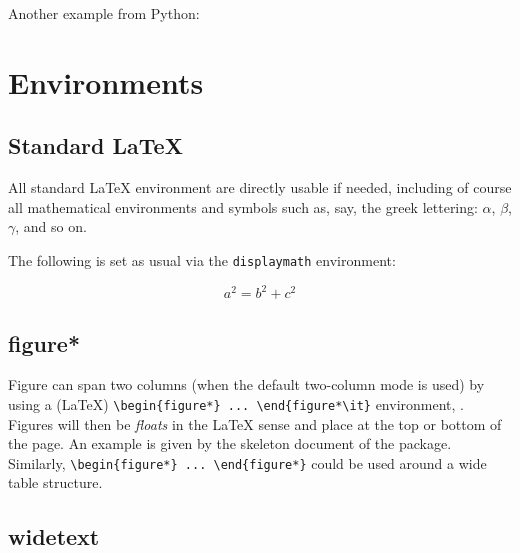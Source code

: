 \documentclass[letterpaper,9pt,twocolumn,twoside,]{pinp}
\begin{document}
Another example from Python:

\begin{Shaded}
\begin{Highlighting}[]
\NormalTok{):}
    
   
\end{Highlighting}
\end{Shaded}

\hypertarget{environments}{%
\section{Environments}\label{environments}}

\hypertarget{standard-latex}{%
\subsection{Standard LaTeX}\label{standard-latex}}

All standard LaTeX environment are directly usable if needed, including
of course all mathematical environments and symbols such as, say, the
greek lettering: \(\alpha\), \(\beta\), \(\gamma\), and so on.

The following is set as usual via the \texttt{displaymath} environment:

\begin{displaymath}
    a^2 = b^2 + c^2
\end{displaymath}

\hypertarget{figure}{%
\subsection{figure*}\label{figure}}

Figure can span two columns (when the default two-column mode is used)
by using a (LaTeX)
\texttt{\textbackslash{}begin\{figure*\}\ ...\ \textbackslash{}end\{figure*\textbackslash{}it\}}
environment, . Figures will then be \emph{floats} in the LaTeX sense and
place at the top or bottom of the page. An example is given by the
skeleton document of the package. Similarly,
\texttt{\textbackslash{}begin\{figure*\}\ ...\ \textbackslash{}end\{figure*\}}
could be used around a wide table structure.

\hypertarget{widetext}{%
\subsection{widetext}\label{widetext}}
\end{document}
